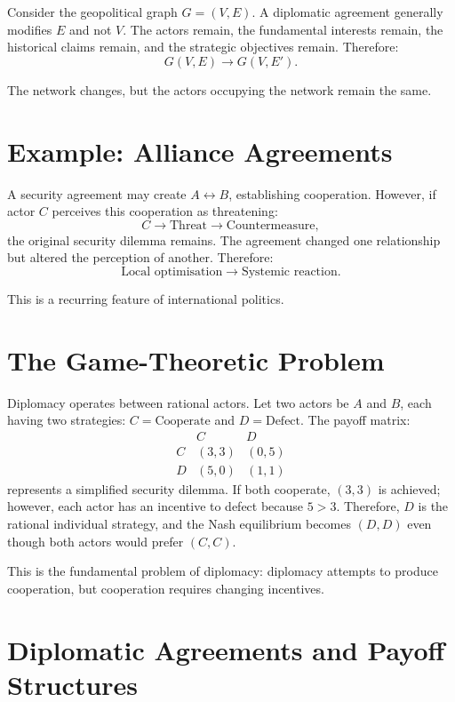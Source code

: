 \documentclass[11pt,openany]{book}
\theoremstyle{plain}
\theoremstyle{definition}
\begin{document}
Consider the geopolitical graph \(G = (V, E)\). A diplomatic agreement generally modifies \(E\) and not \(V\). The actors remain, the fundamental interests remain, the historical claims remain, and the strategic objectives remain. Therefore:
\[
G(V, E) \longrightarrow G(V, E').
\]

The network changes, but the actors occupying the network remain the same.

\section*{Example: Alliance Agreements}

A security agreement may create \(A \leftrightarrow B\), establishing cooperation. However, if actor \(C\) perceives this cooperation as threatening:
\[
C \longrightarrow \text{Threat} \longrightarrow \text{Countermeasure},
\]
the original security dilemma remains. The agreement changed one relationship but altered the perception of another. Therefore:
\[
\text{Local optimisation}
\longrightarrow
\text{Systemic reaction}.
\]

This is a recurring feature of international politics.

\section*{The Game-Theoretic Problem}

Diplomacy operates between rational actors. Let two actors be \(A\) and \(B\), each having two strategies: \(C = \text{Cooperate}\) and \(D = \text{Defect}\). The payoff matrix:
\[
\begin{array}{c|cc}
& C & D \\
\hline
C & (3, 3) & (0, 5) \\
D & (5, 0) & (1, 1)
\end{array}
\]
represents a simplified security dilemma. If both cooperate, \((3, 3)\) is achieved; however, each actor has an incentive to defect because \(5 > 3\). Therefore, \(D\) is the rational individual strategy, and the Nash equilibrium becomes \((D, D)\) even though both actors would prefer \((C, C)\).

This is the fundamental problem of diplomacy: diplomacy attempts to produce cooperation, but cooperation requires changing incentives.

\section*{Diplomatic Agreements and Payoff Structures}
\end{document}
